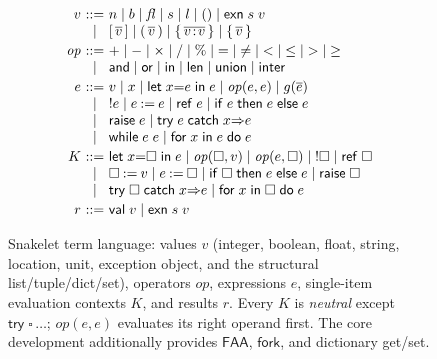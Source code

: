 \documentclass[sigconf,nonacm]{acmart}
\begin{document}
\begin{figure}[t]
\footnotesize
\[
\begin{array}{r@{\ }c@{\ }l}
v &::=& n \mid b \mid \mathit{fl} \mid s \mid l \mid () \mid \mathsf{exn}\;s\;v \\
  &\mid& [\,\overline{v}\,] \mid (\,\overline{v}\,) \mid \{\,\overline{v\!:\!v}\,\} \mid \{\,\overline{v}\,\} \\[2pt]
\mathit{op} &::=& {+} \mid {-} \mid {\times} \mid {/} \mid \mathbin{\%} \mid {=} \mid {\neq} \mid {<} \mid {\leq} \mid {>} \mid {\geq} \\
  &\mid& \mathsf{and} \mid \mathsf{or} \mid \mathsf{in} \mid \mathsf{len} \mid \mathsf{union} \mid \mathsf{inter} \\[2pt]
e &::=& v \mid x \mid \mathsf{let}\;x{=}e\;\mathsf{in}\;e \mid \mathit{op}(e,e) \mid g(\overline{e}) \\
  &\mid& \mathord{!}e \mid e \mathbin{:=} e \mid \mathsf{ref}\;e \mid \mathsf{if}\;e\;\mathsf{then}\;e\;\mathsf{else}\;e \\
  &\mid& \mathsf{raise}\;e \mid \mathsf{try}\;e\;\mathsf{catch}\;x{\Rightarrow}e \\
  &\mid& \mathsf{while}\;e\;e \mid \mathsf{for}\;x\;\mathsf{in}\;e\;\mathsf{do}\;e \\[2pt]
K &::=& \mathsf{let}\;x{=}\square\;\mathsf{in}\;e \mid \mathit{op}(\square,v) \mid \mathit{op}(e,\square) \mid \mathord{!}\square \mid \mathsf{ref}\;\square \\
  &\mid& \square \mathbin{:=} v \mid e \mathbin{:=} \square \mid \mathsf{if}\;\square\;\mathsf{then}\;e\;\mathsf{else}\;e \mid \mathsf{raise}\;\square \\
  &\mid& \mathsf{try}\;\square\;\mathsf{catch}\;x{\Rightarrow}e \mid \mathsf{for}\;x\;\mathsf{in}\;\square\;\mathsf{do}\;e \\[2pt]
r &::=& \mathsf{val}\;v \mid \mathsf{exn}\;s\;v
\end{array}
\]
\caption{Snakelet term language: values $v$ (integer, boolean, float, string,
location, unit, exception object, and the structural list/tuple/dict/set),
operators $\mathit{op}$, expressions $e$, single-item evaluation contexts $K$, and
results $r$. Every $K$ is \emph{neutral} except $\mathsf{try}\;\square\,\dots$;
$\mathit{op}(e,e)$ evaluates its right operand first. The core development
additionally provides $\mathsf{FAA}$, $\mathsf{fork}$, and dictionary get/set.}
\label{fig:grammar}
\end{figure}
\end{document}
